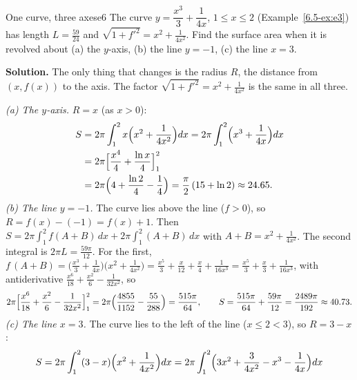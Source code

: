 \documentclass[11pt]{article}
\begin{document}
\begin{exmp}{One curve, three axes}{e6}
The curve $y=\dfrac{x^3}3+\dfrac1{4x}$, $1\le x\le2$ (Example~\ref{6.5-ex:e3}) has length $L=\frac{59}{24}$ and $\sqrt{1+f'^2}=x^2+\frac1{4x^2}$. Find the surface area when it is revolved about (a) the $y$-axis, (b) the line $y=-1$, (c) the line $x=3$.

\textbf{Solution.} The only thing that changes is the radius $R$, the distance from $(x,f(x))$ to the axis. The factor $\sqrt{1+f'^2}=x^2+\frac1{4x^2}$ is the same in all three.

\emph{(a) The $y$-axis.} $R=x$ (as $x>0$):
\[
\begin{aligned}
S&=2\pi\int_1^2x\Bigl(x^2+\frac1{4x^2}\Bigr)dx=2\pi\int_1^2\Bigl(x^3+\frac1{4x}\Bigr)dx\\
&=2\pi\Bigl[\frac{x^4}4+\frac{\ln x}4\Bigr]_1^2\\
&=2\pi\Bigl(4+\frac{\ln2}4-\frac14\Bigr)=\frac\pi2\,(15+\ln2)\approx24.65 .
\end{aligned}
\]
\emph{(b) The line $y=-1$.} The curve lies above the line ($f>0$), so $R=f(x)-(-1)=f(x)+1$. Then $S=2\pi\int_1^2f(A+B)\,dx+2\pi\int_1^2(A+B)\,dx$ with $A+B=x^2+\frac1{4x^2}$. The second integral is $2\pi L=\frac{59\pi}{12}$. For the first, $f\,(A+B)=\bigl(\frac{x^3}3+\frac1{4x}\bigr)\bigl(x^2+\frac1{4x^2}\bigr)=\frac{x^5}3+\frac x{12}+\frac x4+\frac1{16x^3}=\frac{x^5}3+\frac x3+\frac1{16x^3}$, with antiderivative $\frac{x^6}{18}+\frac{x^2}6-\frac1{32x^2}$, so
\[
2\pi\Bigl[\frac{x^6}{18}+\frac{x^2}6-\frac1{32x^2}\Bigr]_1^2=2\pi\Bigl(\frac{4855}{1152}-\frac{55}{288}\Bigr)=\frac{515\pi}{64},
\qquad S=\frac{515\pi}{64}+\frac{59\pi}{12}=\frac{2489\pi}{192}\approx40.73 .
\]
\emph{(c) The line $x=3$.} The curve lies to the left of the line ($x\le2<3$), so $R=3-x$:
\[
\begin{aligned}
S&=2\pi\int_1^2(3-x)\Bigl(x^2+\frac1{4x^2}\Bigr)dx=2\pi\int_1^2\Bigl(3x^2+\frac3{4x^2}-x^3-\frac1{4x}\Bigr)dx\\

\end{aligned}\]
\end{exmp}
\end{document}
